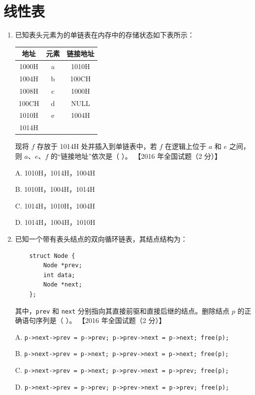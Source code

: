 \documentclass[lang=cn,newtx,10pt,scheme=chinese]{../../elegantbook}
\begin{document}
\chapter{线性表}
\begin{enumerate}
\item 已知表头元素为的单链表在内存中的存储状态如下表所示：
    \begin{table}[h!]
        \centering
        \begin{tabular}{|c|c|c|}
            \hline
            地址 & 元素 & 链接地址 \\ \hline
            1000H & a & 1010H \\ \hline
            1004H & b & 100CH \\ \hline
            1008H & c & 1000H \\ \hline
            100CH & d & NULL \\ \hline
            1010H & e & 1004H \\ \hline
            1014H &   &  \\ \hline
        \end{tabular}
    \end{table}

    现将 $f$ 存放于 1014H 处并插入到单链表中，若 $f$ 在逻辑上位于 $a$ 和 $e$ 之间，则 $a$、$e$、$f$ 的“链接地址”依次是（ ）。  
    【2016 年全国试题（2 分）】 

    A. 1010H，1014H，1004H  

    B. 1010H，1004H，1014H 

    C. 1014H，1010H，1004H  

    D. 1014H，1004H，1010H  

    \item 已知一个带有表头结点的双向循环链表，其结点结构为：
    \begin{verbatim}
    struct Node {
        Node *prev;
        int data;
        Node *next;
    };
    \end{verbatim}
    其中，\texttt{prev} 和 \texttt{next} 分别指向其直接前驱和直接后继的结点。删除结点 $p$ 的正确语句序列是（ ）。  
    【2016 年全国试题（2 分）】  

    A. \texttt{p->next->prev = p->prev; p->prev->next = p->next; free(p);}  

    B. \texttt{p->next->prev = p->next; p->prev->next = p->next; free(p);}  

    C. \texttt{p->next->prev = p->next; p->prev->next = p->prev; free(p);}  

    D. \texttt{p->next->prev = p->prev; p->prev->next = p->prev; free(p);}  


\end{enumerate}
\end{document}
